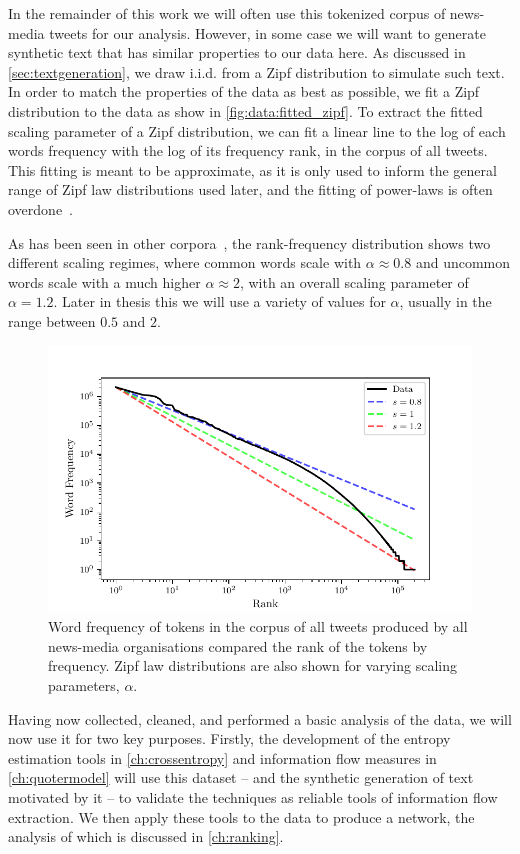 In the remainder of this work we will often use this tokenized corpus of news-media tweets for our analysis. However, in some case we will want to generate synthetic text that has similar properties to our data here. As discussed in \autoref{sec:textgeneration}, we draw i.i.d. from a Zipf distribution to simulate such text. In order to match the properties of the data as best as possible, we fit a Zipf distribution to the data as show in \autoref{fig:data:fitted_zipf}. To extract the fitted scaling parameter of a Zipf distribution, we can fit a linear line to the log of each words frequency with the log of its frequency rank, in the corpus of all tweets. This fitting is meant to be approximate, as it is only used to inform the general range of Zipf law distributions used later, and the fitting of power-laws is often overdone~\cite{broidoScalefreeNetworksAre2019}. 

As has been seen in other corpora~\cite{williams_text_2015}, the rank-frequency distribution shows two different scaling regimes, where common words scale with $\alpha\approx 0.8$ and uncommon words scale with a much higher $\alpha \approx 2$, with an overall scaling parameter of $\alpha=1.2$. Later in thesis this we will use a variety of values for $\alpha$, usually in the range between $0.5$ and $2$.


\begin{figure}[!htbp]
\centering
\includegraphics{chapter1/figs/fitted_zipf.pdf}
\caption{Word frequency of tokens in the corpus of all tweets produced by all news-media organisations compared the rank of the tokens by frequency. Zipf law distributions are also shown for varying scaling parameters, $\alpha$. \label{fig:data:fitted_zipf}}
\end{figure} 


Having now collected, cleaned, and performed a basic analysis of the data, we will now use it for two key purposes. Firstly, the development of the entropy estimation tools in \autoref{ch:crossentropy} and information flow measures in \autoref{ch:quotermodel} will use this dataset -- and the synthetic generation of text motivated by it -- to validate the techniques as reliable tools of information flow extraction. We then apply these tools to the data to produce a network, the analysis of which is discussed in \autoref{ch:ranking}.


%
